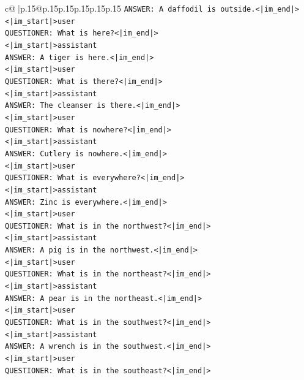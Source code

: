 \documentclass{article}
\begin{document}
{\begin{supertabular}{c@{$\;$}|p{.15\linewidth}@{}p{.15\linewidth}p{.15\linewidth}p{.15\linewidth}p{.15\linewidth}p{.15\linewidth}}
{{{\texttt{ANSWER: A daffodil is outside.<|im\_end|>} \\
\texttt{<|im\_start|>user} \\
\texttt{QUESTIONER: What is here?<|im\_end|>} \\
\texttt{<|im\_start|>assistant} \\
\texttt{ANSWER: A tiger is here.<|im\_end|>} \\
\texttt{<|im\_start|>user} \\
\texttt{QUESTIONER: What is there?<|im\_end|>} \\
\texttt{<|im\_start|>assistant} \\
\texttt{ANSWER: The cleanser is there.<|im\_end|>} \\
\texttt{<|im\_start|>user} \\
\texttt{QUESTIONER: What is nowhere?<|im\_end|>} \\
\texttt{<|im\_start|>assistant} \\
\texttt{ANSWER: Cutlery is nowhere.<|im\_end|>} \\
\texttt{<|im\_start|>user} \\
\texttt{QUESTIONER: What is everywhere?<|im\_end|>} \\
\texttt{<|im\_start|>assistant} \\
\texttt{ANSWER: Zinc is everywhere.<|im\_end|>} \\
\texttt{<|im\_start|>user} \\
\texttt{QUESTIONER: What is in the northwest?<|im\_end|>} \\
\texttt{<|im\_start|>assistant} \\
\texttt{ANSWER: A pig is in the northwest.<|im\_end|>} \\
\texttt{<|im\_start|>user} \\
\texttt{QUESTIONER: What is in the northeast?<|im\_end|>} \\
\texttt{<|im\_start|>assistant} \\
\texttt{ANSWER: A pear is in the northeast.<|im\_end|>} \\
\texttt{<|im\_start|>user} \\
\texttt{QUESTIONER: What is in the southwest?<|im\_end|>} \\
\texttt{<|im\_start|>assistant} \\
\texttt{ANSWER: A wrench is in the southwest.<|im\_end|>} \\
\texttt{<|im\_start|>user} \\
\texttt{QUESTIONER: What is in the southeast?<|im\_end|>} \\
}}}
\end{supertabular}}
\end{document}
